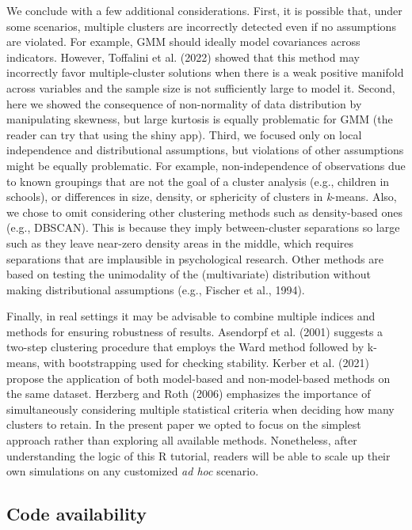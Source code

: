 \documentclass[
  man,floatsintext]{apa7}
\begin{document}
We conclude with a few additional considerations. First, it is possible that, under some scenarios, multiple clusters are incorrectly detected even if no assumptions are violated. For example, GMM should ideally model covariances across indicators. However, Toffalini et al. (2022) showed that this method may incorrectly favor multiple-cluster solutions when there is a weak positive manifold across variables and the sample size is not sufficiently large to model it. Second, here we showed the consequence of non-normality of data distribution by manipulating skewness, but large kurtosis is equally problematic for GMM (the reader can try that using the shiny app). Third, we focused only on local independence and distributional assumptions, but violations of other assumptions might be equally problematic. For example, non-independence of observations due to known groupings that are not the goal of a cluster analysis (e.g., children in schools), or differences in size, density, or sphericity of clusters in \emph{k}-means. Also, we chose to omit considering other clustering methods such as density-based ones (e.g., DBSCAN). This is because they imply between-cluster separations so large such as they leave near-zero density areas in the middle, which requires separations that are implausible in psychological research. Other methods are based on testing the unimodality of the (multivariate) distribution without making distributional assumptions (e.g., Fischer et al., 1994).

\color{red} Finally, in real settings it may be advisable to combine multiple indices and methods for ensuring robustness of results. Asendorpf et al. (2001) suggests a two-step clustering procedure that employs the Ward method followed by k-means, with bootstrapping used for checking stability. Kerber et al. (2021) propose the application of both model-based and non-model-based methods on the same dataset. Herzberg and Roth (2006) emphasizes the importance of simultaneously considering multiple statistical criteria when deciding how many clusters to retain. In the present paper we opted to focus on the simplest approach rather than exploring all available methods. \color{black} Nonetheless, after understanding the logic of this R tutorial, readers will be able to scale up their own simulations on any customized \emph{ad hoc} scenario.

\hfill\break

\hypertarget{code-availability}{%
\subsection{Code availability}\label{code-availability}}
\end{document}
